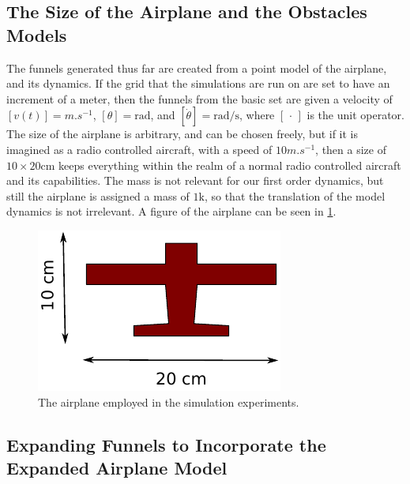 \subsection{The Size of the Airplane and the Obstacles Models}
\label{subsec:deciding-model-size}

The funnels generated thus far are created from a point model of the airplane,
and its dynamics. If the grid that the simulations are run on are set to have an
increment of a meter, then the funnels from the basic set are given a velocity
of \([v(t)] = \si{m.s^{-1}}\), \([\theta] = \si{\radian}\), and \([\dot{\theta}]
= \si{\radian\per\second}\), where \( [\, \cdot \,] \) is the unit operator. The
size of the airplane is arbitrary, and can be chosen freely, but if it is
imagined as a radio controlled aircraft, with a speed of \(10\si{m.s^{-1}}\),
then a size of \(10 \times 20 \si{\centi\metre} \) keeps everything within the
realm of a normal radio controlled aircraft and its capabilities. The mass is
not relevant for our first order dynamics, but still the airplane is assigned a
mass of \(1 \si{\kilo}\), so that the translation of the model dynamics is not
irrelevant. A figure of the airplane can be seen in \cref{fig:radio-vehicle}.

\begin{figure}
  \centering
  \includegraphics[width=.8\textwidth]{figures/experiments/radio-vehicle-model}
  \caption{The airplane employed in the simulation experiments.}
  \label{fig:radio-vehicle}
\end{figure}

\subsection{Expanding Funnels to Incorporate the Expanded Airplane Model}
\label{subsec:expand-funnel}

